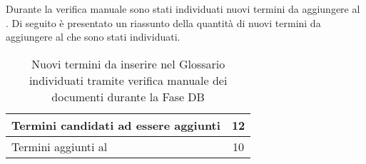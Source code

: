 				Durante la verifica manuale sono stati individuati nuovi termini da aggiungere al . Di seguito è presentato un 
				riassunto della quantità di nuovi termini da aggiungere al  che sono stati individuati.
				\begin{table}[H]
					\centering
					\begin{tabu}{| l | c |}
						\hline
						Termini candidati ad essere aggiunti	&	12\\ \hline
						Termini aggiunti al 	& 10\\ \hline
					\end{tabu}
					\caption{Nuovi termini da inserire nel Glossario individuati tramite verifica manuale dei documenti durante la Fase DB}
				\end{table}
